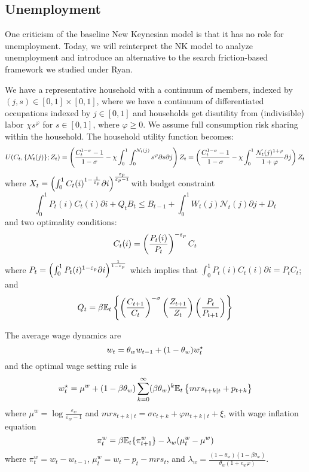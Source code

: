 \documentclass[10pt]{article}
\begin{document}
\subsection{Unemployment}\label{subsec:9}

\begin{remark}
	One criticism of the baseline New Keynesian model is that it has no role for unemployment. Today, we will reinterpret the NK model to analyze unemployment and introduce an alternative to the search friction-based framework we studied under Ryan.
\end{remark}

\begin{model}
	 We have a representative household with a continuum of members, indexed by $(j,s) \in [0,1] \times [0,1]$, where we have a continuum of differentiated occupations indexed by $j \in [0,1]$ and households get disutility from (indivisible) labor $\chi s^\varphi$ for $s \in [0,1]$, where $\varphi \ge 0$. We assume full consumption risk sharing within the household. The household utility function becomes: \[U(C_t,\{\mathcal{N}_t(j)\};Z_t) = \left( \frac{C_t^{1-\sigma}-1}{1-\sigma} - \chi \int_0^1 \int_0^{\mathcal{N}_t(j)} s^\varphi \partial s \partial j \right) Z_t = \left( \frac{C_t^{1-\sigma}-1}{1-\sigma} - \chi \int_0^1 \frac{\mathcal{N}_t(j)^{1+\varphi}}{1+\varphi} \partial j \right) Z_t\]where $X_t = \left( \int_0^1 C_t(i)^{1 - \frac{1}{\varepsilon_p}} \partial i \right)^{\frac{\varepsilon_p}{\varepsilon_p-1}}$with budget constraint\[\int_0^1 P_t(i)C_t(i)\partial i + Q_t B_t \le B_{t-1} + \int_0^1 W_t(j)\mathcal{N}_t(j)\partial j + D_t\]and two optimality conditions:\[C_t(i) = \left( \frac{P_t(i)}{P_t}\right)^{-\varepsilon_p} C_t\]where $P_t = \left( \int_0^1 P_t(i)^{1-\varepsilon_p} \partial i \right)^{\frac{1}{1-\varepsilon_p}}$ which implies that $\int_0^1 P_t(i)C_t(i)\partial i = P_tC_t$; and\[Q_t = \beta \mathbb{E}_t \left\{ \left( \frac{C_{t+1}}{C_t}\right)^{-\sigma} \left( \frac{Z_{t+1}}{Z_t}\right) \left( \frac{P_t}{P_{t+1}}\right)\right\}\]
	
	The average wage dynamics are\[w_t = \theta_w w_{t-1} + (1-\theta_w)w_t^\star\]and the optimal wage setting rule is\[w_t^\star = \mu^w + (1-\beta\theta_w) \sum_{k=0}^\infty (\beta\theta_w)^k \mathbb{E}_t\left\{ mrs_{t+k\mid t} + p_{t+k}\right\}\]where $\mu^w = \log \frac{\varepsilon_w}{\varepsilon_w-1}$ and $mrs_{t+k\mid t} = \sigma c_{t+k} + \varphi n_{t+k\mid t} + \xi$, with wage inflation equation\[\pi_t^w = \beta \mathbb{E}_t \{\pi_{t+1}^w\} - \lambda_w (\mu_t^w - \mu^w)\]where $\pi_t^w = w_t - w_{t-1}$, $\mu_t^w = w_t - p_t - mrs_t$, and $\lambda_w = \frac{(1-\theta_w)(1-\beta\theta_w)}{\theta_w(1+e_w\varphi)}$. 
	

\end{model}
\end{document}
